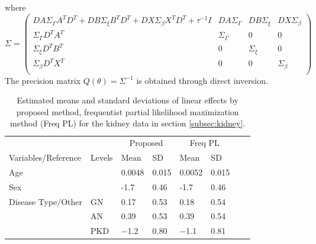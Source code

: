 \documentclass[ba]{imsart}
\begin{document}
where
\begin{equation*}
\Sigma = \begin{pmatrix}
DA\Sigma_{\Gamma}A^{T}D^{T} + DB\Sigma_{\xi}B^{T}D^{T} + DX\Sigma_{\beta}X^{T}D^{T} + \tau^{-1}I & DA\Sigma_{\Gamma} & DB\Sigma_{\xi} & DX\Sigma_{\beta} \\
\Sigma_{\Gamma}D^{T}A^{T} & \Sigma_{\Gamma} & 0 & 0 \\
\Sigma_{\xi}D^{T}B^{T} & 0 & \Sigma_{\xi} & 0 \\
\Sigma_{\beta}D^{T}X^{T} & 0 & 0 & \Sigma_{\beta} \\
\end{pmatrix}
\end{equation*}
The precision matrix $Q(\theta) = \Sigma^{-1}$ is obtained through direct inversion.


\nocite{*}%

%




\begin{table}
\begin{tabular}
{|p{3cm}|
p{1cm}|p{1cm}p{1cm}|p{1cm}p{1cm}|p{1cm}p{1cm}|}
\cline{1-8}
      \multicolumn{1}{l}{} &
      \multicolumn{1}{l}{} &
      \multicolumn{2}{c}{Proposed} &
      \multicolumn{2}{c}{Freq PL}\\
      Variables/Reference & Levels & {Mean} & {SD} & {Mean} & {SD} \\
 \hline
 Age & & 0.0048&0.015 & 0.0052&0.015\\
 Sex & & -1.7&0.46  & -1.7&0.46\\
 Disease Type/Other & GN & 0.17&0.53 &  0.18&0.54\\
  & AN & 0.39&0.53 & 0.39&0.54\\
  & PKD & −1.2&0.80  & −1.1&0.81\\
\hline
\end{tabular}
\caption{Estimated means and standard deviations of linear effects by proposed method, frequentist partial likelihood maximization method (Freq PL) for the kidney data in section \ref{subsec:kidney}.}
\label{table:KidneyFixed}
\end{table}
\end{document}
